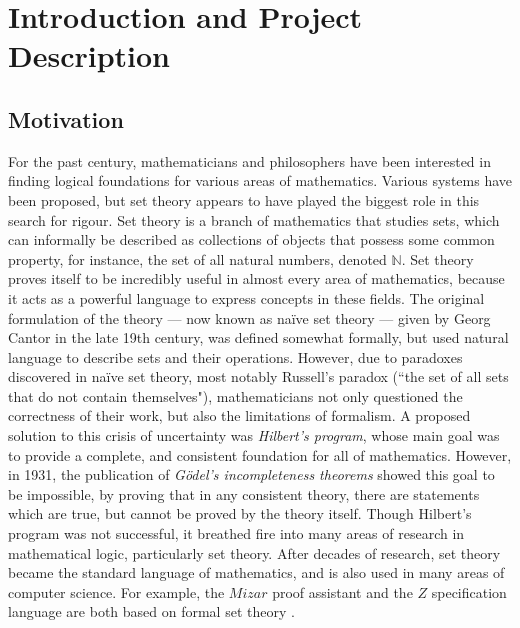 \documentclass[11pt]{report}
\theoremstyle{definition}
\theoremstyle{theorem}
\theoremstyle{lemma}
\begin{document}
\tableofcontents

\chapter{Introduction and Project Description}
\section{Motivation}
For the past century, mathematicians and philosophers have been interested in finding logical foundations for various areas of mathematics. Various systems have been proposed, but set theory appears to have played the biggest role in this search for rigour.
Set theory is a branch of mathematics that studies sets, which can informally be described as collections of objects that possess some common property, for instance, the set of all natural numbers, denoted $\mathbb{N}$.
Set theory proves itself to be incredibly useful in almost every area of mathematics, because it acts as a powerful language to express concepts in these fields.
The original formulation of the theory --- now known as na\"ive set theory --- given by Georg Cantor in the late 19th century, was defined somewhat formally, but used natural language to describe sets and their operations.
However, due to paradoxes discovered in na\"ive set theory, most notably Russell's paradox (``the set of all sets that do not contain themselves"), mathematicians not only questioned the correctness of their work, but also the limitations of formalism.
A proposed solution to this crisis of uncertainty was \emph{Hilbert's program}, whose main goal was to provide a complete, and consistent foundation for all of mathematics.
However, in 1931, the publication of \emph{G\"odel's incompleteness theorems} showed this goal to be impossible, by proving that in any consistent theory, there are statements which are true, but cannot be proved by the theory itself.
Though Hilbert's program was not successful, it breathed fire into many areas of research in mathematical logic, particularly set theory.
After decades of research, set theory became the standard language of mathematics, and is also used in many areas of computer science.
For example, the $\mathit{Mizar}$ proof assistant and the $\mathit{Z}$ specification language are both based on formal set theory \cite{mizar} \cite{zspec}.\\
\end{document}

